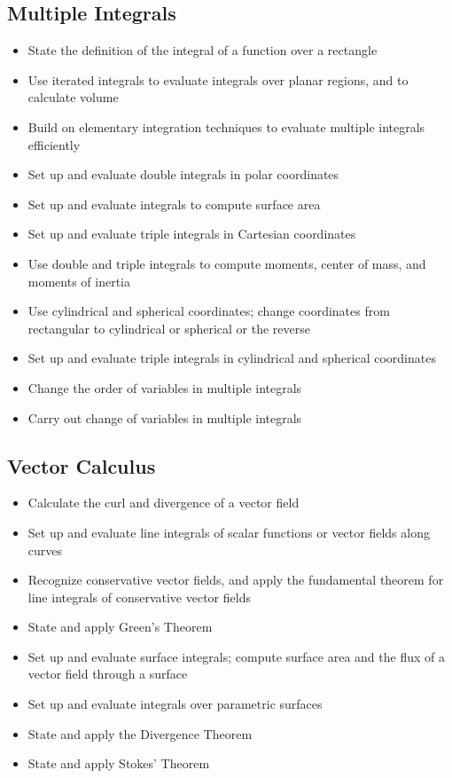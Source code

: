 \documentclass[11pt]{article}
\begin{document}
\subsection{Multiple Integrals}
\begin{itemize}
\setlength\itemsep{-.5em}
\item State the definition of the integral of a function over a rectangle
\item Use iterated integrals to evaluate integrals over planar regions,
and to calculate volume
\item Build on elementary integration techniques to evaluate
multiple integrals efficiently
\item Set up and evaluate double integrals in polar coordinates
\item Set up and evaluate integrals to compute surface area
\item Set up and evaluate triple integrals in Cartesian coordinates
\item Use double and triple integrals to compute moments, center of mass,
and moments of inertia
\item Use cylindrical and spherical coordinates; change coordinates from 
rectangular to cylindrical or spherical or the reverse
\item Set up and evaluate triple integrals in cylindrical and spherical coordinates
\item Change the order of variables in multiple integrals
\item Carry out change of variables in multiple integrals
\end{itemize}
\subsection{Vector Calculus}
\begin{itemize}
\setlength\itemsep{-.5em}
\item Calculate the curl and divergence of a vector field
\item Set up and evaluate line integrals of scalar functions
or vector fields along curves
\item Recognize conservative vector fields, and apply the fundamental 
theorem for line integrals of conservative vector fields
\item State and apply Green's Theorem
\item Set up and evaluate surface integrals; compute surface area and 
the flux of a vector field through a surface
\item Set up and evaluate integrals over parametric surfaces
\item State and apply the Divergence Theorem
\item State and apply Stokes' Theorem
\end{itemize}
\end{document}
